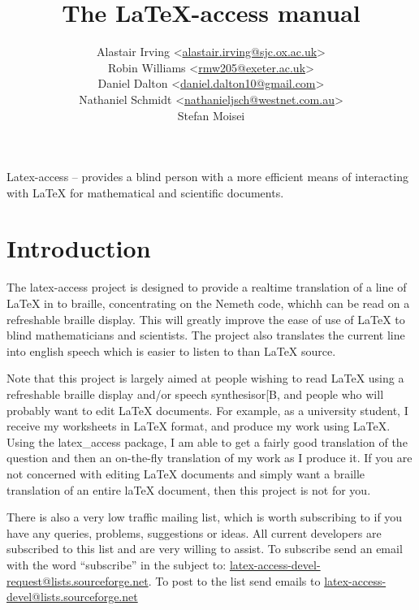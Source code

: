\documentclass[12pt,a4paper]{report}
\begin{document}
\title{The LaTeX-access manual}
\author{Alastair Irving <\href{mailto:alastair.irving@sjc.ox.ac.uk}{alastair.irving@sjc.ox.ac.uk}>\\
  Robin  Williams <\href{mailto:rmw205@exeter.ac.uk}{rmw205@exeter.ac.uk}>\\
  Daniel Dalton <\href{mailto:<daniel.dalton10@gmail.com}{daniel.dalton10@gmail.com}>\\
  Nathaniel Schmidt <\href{mailto:nathanieljsch@westnet.com.au}{nathanieljsch@westnet.com.au}>\\
  Stefan Moisei}
\maketitle
\tableofcontents

Latex-access -- provides a blind person with a more efficient means of
interacting with LaTeX for mathematical and scientific documents.

\chapter{Introduction}
\label{ch-introduction}

The latex-access project is designed to provide a realtime
translation of a line of LaTeX in to braille, concentrating
on the Nemeth code, whichh can be read on a refreshable braille
display. This will greatly improve the ease of use of
LaTeX to blind mathematicians and scientists. The project also
translates the current line into english speech which is
easier to listen to than LaTeX source.

Note that this project is largely aimed at people wishing
to read LaTeX using a refreshable braille display and/or
speech synthesisor[B, and people who will probably
want to edit LaTeX documents. For example, as a
university student,
I receive my worksheets in LaTeX format, and
produce my work using LaTeX. Using the latex\_access
package, I am able to
get a fairly good translation of the question
and then an on-the-fly translation of my work as
I produce it. If you are
not concerned with editing LaTeX documents
and simply want a braille translation of an
entire laTeX document, then this
project is not for you.

There is also a very low traffic mailing list, which is worth subscribing to if you have any
queries, problems, suggestions or ideas. All current developers are
subscribed to this list and are very willing to assist. To subscribe
send an email with the word ``subscribe'' in the subject to:
\href{mailto:latex-access-devel-request@lists.sourceforge.net}{latex-access-devel-request@lists.sourceforge.net}. To
post to the list send emails to \href{mailto:latex-access-devel@lists.sourceforge.net}{latex-access-devel@lists.sourceforge.net}
\end{document}
